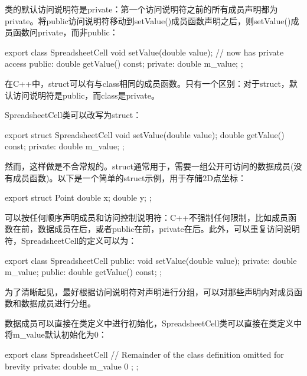 类的默认访问说明符是private：第一个访问说明符之前的所有成员声明都为private。将public访问说明符移动到setValue()成员函数声明之后，则setValue()成员函数问private，而非public：

\begin{cpp}
export class SpreadsheetCell
{
        void setValue(double value); // now has private access
    public:
        double getValue() const;
    private:
        double m_value;
};
\end{cpp}

在C++中，struct可以有与class相同的成员函数。只有一个区别：对于struct，默认访问说明符是public，而class是private。

SpreadsheetCell类可以改写为struct：

\begin{cpp}
export struct SpreadsheetCell
{
    void setValue(double value);
        double getValue() const;
    private:
        double m_value;
};
\end{cpp}

然而，这样做是不合常规的。struct通常用于，需要一组公开可访问的数据成员(没有成员函数)。以下是一个简单的struct示例，用于存储2D点坐标：

\begin{cpp}
export struct Point
{
    double x;
    double y;
};
\end{cpp}


可以按任何顺序声明成员和访问控制说明符：C++不强制任何限制，比如成员函数在前，数据成员在后，或者public在前，private在后。此外，可以重复访问说明符，SpreadsheetCell的定义可以为：

\begin{cpp}
export class SpreadsheetCell
{
    public:
        void setValue(double value);
    private:
        double m_value;
    public:
        double getValue() const;
};
\end{cpp}

为了清晰起见，最好根据访问说明符对声明进行分组，可以对那些声明内对成员函数和数据成员进行分组。


数据成员可以直接在类定义中进行初始化，SpreadsheetCell类可以直接在类定义中将m\_value默认初始化为0：

\begin{cpp}
export class SpreadsheetCell
{
    // Remainder of the class definition omitted for brevity
    private:
        double m_value { 0 };
};
\end{cpp}

